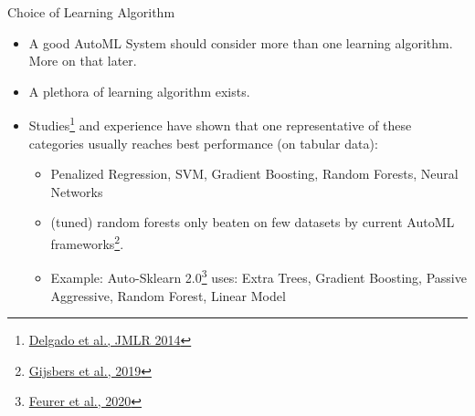 \begin{frame}{Choice of Learning Algorithm}
  \begin{itemize}
    \item A good AutoML System should consider more than one learning algorithm. More on that later.
    \item A plethora of learning algorithm exists.
    \item Studies\footnote{\href{https://dl.acm.org/doi/10.5555/2627435.2697065}{Delgado et al., JMLR 2014}} and experience have shown that one representative of these categories usually reaches best performance (on tabular data):
    \begin{itemize}
      \item Penalized Regression, SVM, Gradient Boosting, Random Forests, Neural Networks
      \item (tuned) random forests only beaten on few datasets by current AutoML frameworks\footnote{\href{https://arxiv.org/abs/1907.00909}{Gijsbers et al., 2019}}.
      \item Example: Auto-Sklearn 2.0\footnote{\href{https://arxiv.org/abs/2007.04074}{Feurer et al., 2020}} uses: Extra Trees, Gradient Boosting, Passive Aggressive, Random Forest, Linear Model
    \end{itemize}
  \end{itemize}
\end{frame}

